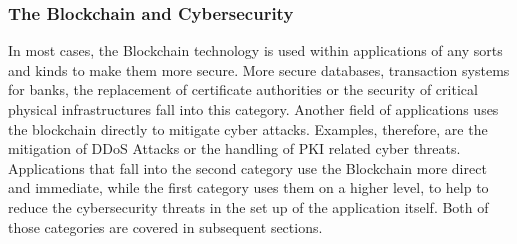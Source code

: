 \subsubsection{The Blockchain and Cybersecurity}
In most cases, the Blockchain technology is used within applications of any sorts and kinds to make them more secure. More secure databases, transaction systems for banks, the replacement of certificate authorities or the security of critical physical infrastructures fall into this category. Another field of applications uses the blockchain directly to mitigate cyber attacks. Examples, therefore, are the mitigation of DDoS Attacks or the handling of PKI related cyber threats. Applications that fall into the second category use the Blockchain more direct and immediate, while the first category uses them on a higher level, to help to reduce the cybersecurity threats in the set up of the application itself. Both of those categories are covered in subsequent sections.
